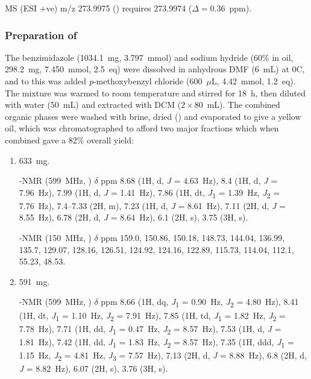 \begin{refsection}
MS (ESI +ve) m/z 273.9975 ()  requires 273.9974 ($\Delta=0.36$~ppm).

\subsubsection{Preparation of }
The benzimidazole  (1034.1~mg, 3.797~mmol) and sodium hydride (60\% in oil, 298.2~mg, 7.450~mmol, 2.5~eq) were dissolved in anhydrous DMF (6~mL) at 0\degree{}C, and to this was added \textit{p}-methoxybenzyl chloride (600~$\mu$L, 4.42~mmol, 1.2~eq).
The mixture was warmed to room temperature and stirred for 18~h, then diluted with water (50~mL) and extracted with DCM ($2\times80$~mL).
The combined organic phases were washed with brine, dried () and evaporated to give a yellow oil, which was chromatographed to afford two major fractions which when combined gave a 82\% overall yield:
\begin{enumerate}
    \item 633~mg.
    
    -NMR (599~MHz, ) $\delta$ ppm 8.68 (1H, d, \textit{J} = 4.63~Hz), 8.4 (1H, d, \textit{J} = 7.96~Hz), 7.99 (1H, d, \textit{J} = 1.41~Hz), 7.86 (1H, dt, \textit{J}\textsubscript{1} = 1.39~Hz, \textit{J}\textsubscript{2} = 7.76~Hz), 7.4--7.33 (2H, m), 7.23 (1H, d, \textit{J} = 8.61~Hz), 7.11 (2H, d, \textit{J} = 8.55~Hz), 6.78 (2H, d, \textit{J} = 8.64~Hz), 6.1 (2H, s), 3.75 (3H, s).

    -NMR (150~MHz, ) $\delta$ ppm 159.0, 150.86, 150.18, 148.73, 144.04, 136.99, 135.7, 129.07, 128.16, 126.51, 124.92, 124.16, 122.89, 115.73, 114.04, 112.1, 55.23, 48.53.

    \item 591~mg.
    
    -NMR (599~MHz, ) $\delta$ ppm 8.66 (1H, dq, \textit{J}\textsubscript{1} = 0.90~Hz, \textit{J}\textsubscript{2} = 4.80~Hz), 8.41 (1H, dt, \textit{J}\textsubscript{1} = 1.10~Hz, \textit{J}\textsubscript{2} = 7.91~Hz), 7.85 (1H, td, \textit{J}\textsubscript{1} = 1.82~Hz, \textit{J}\textsubscript{2} = 7.78~Hz), 7.71 (1H, dd, \textit{J}\textsubscript{1} = 0.47~Hz, \textit{J}\textsubscript{2} = 8.57~Hz), 7.53 (1H, d, \textit{J} = 1.81~Hz), 7.42 (1H, dd, \textit{J}\textsubscript{1} = 1.83~Hz, \textit{J}\textsubscript{2} = 8.57~Hz), 7.35 (1H, ddd, \textit{J}\textsubscript{1} = 1.15~Hz, \textit{J}\textsubscript{2} = 4.81~Hz, \textit{J}\textsubscript{3} = 7.57~Hz), 7.13 (2H, d, \textit{J} = 8.88~Hz), 6.8 (2H, d, \textit{J} = 8.82~Hz), 6.07 (2H, s), 3.76 (3H, s).


\end{enumerate}
\end{refsection}
